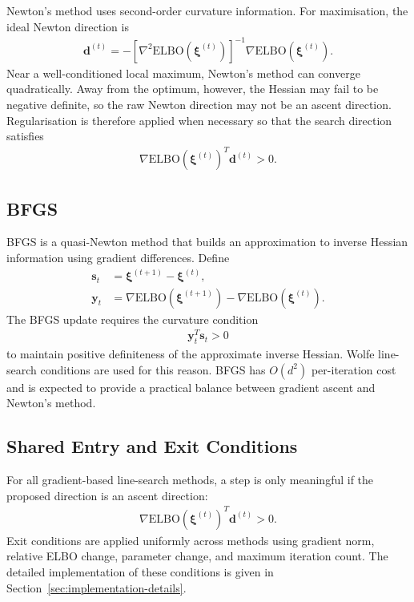 \documentclass[11pt,a4paper]{article}
\newcommand{\ELBO}{\text{ELBO}}
\begin{document}
Newton's method uses second-order curvature information. For maximisation, the ideal Newton direction is
\begin{align}
\bm{d}^{(t)} = -[\nabla^2\ELBO(\bm{\xi}^{(t)})]^{-1}\nabla\ELBO(\bm{\xi}^{(t)}).
\end{align}
Near a well-conditioned local maximum, Newton's method can converge quadratically. Away from the optimum, however, the Hessian may fail to be negative definite, so the raw Newton direction may not be an ascent direction. Regularisation is therefore applied when necessary so that the search direction satisfies
\begin{align}
\nabla\ELBO(\bm{\xi}^{(t)})^T\bm{d}^{(t)} > 0.
\end{align}

\subsection{BFGS}

BFGS is a quasi-Newton method that builds an approximation to inverse Hessian information using gradient differences. Define
\begin{align}
\bm{s}_t &= \bm{\xi}^{(t+1)} - \bm{\xi}^{(t)},\\
\bm{y}_t &= \nabla\ELBO(\bm{\xi}^{(t+1)}) - \nabla\ELBO(\bm{\xi}^{(t)}).
\end{align}
The BFGS update requires the curvature condition
\begin{align}
\bm{y}_t^T\bm{s}_t > 0
\end{align}
to maintain positive definiteness of the approximate inverse Hessian. Wolfe line-search conditions are used for this reason. BFGS has $O(d^2)$ per-iteration cost and is expected to provide a practical balance between gradient ascent and Newton's method.

\subsection{Shared Entry and Exit Conditions}

For all gradient-based line-search methods, a step is only meaningful if the proposed direction is an ascent direction:
\begin{align}
\nabla\ELBO(\bm{\xi}^{(t)})^T\bm{d}^{(t)} > 0.
\end{align}
Exit conditions are applied uniformly across methods using gradient norm, relative ELBO change, parameter change, and maximum iteration count. The detailed implementation of these conditions is given in Section~\ref{sec:implementation-details}.
\end{document}
